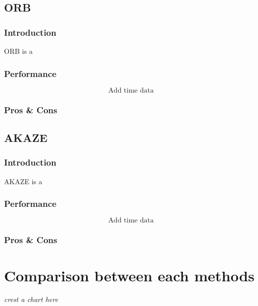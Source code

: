 	\subsection{ORB}
		\subsubsection{Introduction}
		ORB is a
		\subsubsection{Performance}
			$$\textrm{Add time data}$$
		\subsubsection{Pros \& Cons}

	\subsection{AKAZE}
		\subsubsection{Introduction}
		AKAZE is a
		\subsubsection{Performance}
			$$\textrm{Add time data}$$
		\subsubsection{Pros \& Cons}

\section{Comparison between each methods}
\emph{crest a chart here}